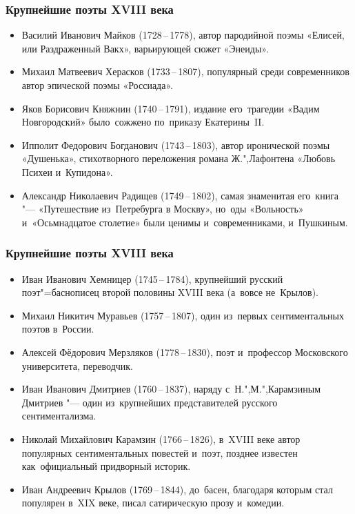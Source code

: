 \documentclass{beamer}
\begin{document}
\begin{frame}
\frametitle{Крупнейшие поэты XVIII века}

\begin{itemize}
\item Василий Иванович Майков (1728\,--\,1778), автор пародийной поэмы «Елисей, или Раздраженный Вакх», варьирующей сюжет «Энеиды».
\item Михаил Матвеевич Херасков (1733\,--\,1807), популярный среди современников автор эпической поэмы «Россиада».
\item Яков Борисович Княжнин (1740\,--\,1791), издание его~трагедии «Вадим Новгородский» было~сожжено по~приказу Екатерины~II.
\item Ипполит Федорович Богданович (1743\,--\,1803), автор иронической поэмы «Душенька», стихотворного переложения романа Ж.",Лафонтена «Любовь Психеи и~Купидона».
\item Александр Николаевич Радищев (1749\,--\,1802), самая знаменитая его~книга "--- «Путешествие из~Петребурга в Москву», но~оды «Вольность» и~«Осьмнадцатое столетие» были ценимы и~современниками, и~Пушкиным.
\end{itemize}

\end{frame}

\begin{frame}
\frametitle{Крупнейшие поэты XVIII века}

\begin{itemize}
\item Иван Иванович Хемницер (1745\,--\,1784), крупнейший русский поэт"=баснописец второй половины XVIII века (а~вовсе не~Крылов).
\item Михаил Никитич Муравьев (1757\,--\,1807), один из~первых сентиментальных поэтов в~России.
\item Алексей Фёдорович Мерзляков (1778\,--\,1830), поэт и~профессор Московского университета, переводчик.
\item Иван Иванович Дмитриев (1760\,--\,1837), наряду с~Н.",М.",Карамзиным Дмитриев "--- один из~крупнейших представителей русского сентиментализма.
\item Николай Михайлович Карамзин (1766\,--\,1826), в~XVIII веке автор популярных сентиментальных повестей и~поэт, позднее известен как~официальный придворный историк.
\item Иван Андреевич Крылов (1769\,--\,1844), до~басен, благодаря которым стал популярен в~XIX веке, писал сатирическую прозу и~комедии.
\end{itemize}

\end{frame}
\end{document}
